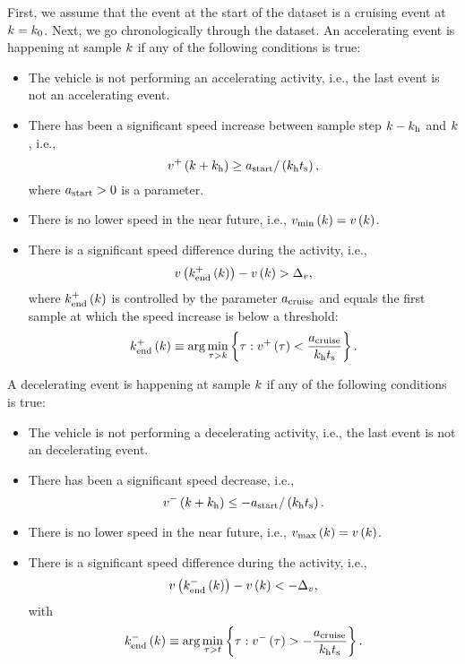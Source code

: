 First, we assume that the event at the start of the dataset is a cruising event at $k=k_{0}$. Next, we go chronologically through the dataset. An accelerating event is happening at sample $k$ if any of the following conditions is true:
\begin{itemize}
	\item The vehicle is not performing an accelerating activity, i.e., the last event is not an accelerating event.
	\item \cstarta There has been a significant speed increase between sample step $k-k_{\mathrm{h}}$ and $k$, i.e., 
	\begin{equation}
		v^{+}\left(k+k_{\mathrm{h}}\right) \geq a_\mathrm{start} / \left( k_{\mathrm{h}}t_\mathrm{s} \right),
	\end{equation} \cenda
	where $a_\mathrm{start}>0$ is a parameter.
	\item There is no lower speed in the near future, i.e., $v_{\mathrm{min}}\left(k\right)=v\left(k\right)$.
	\item There is a significant speed difference during the activity, i.e., 
	\begin{equation}
		v\left(k_{\mathrm{end}}^{+}\left(k\right)\right) - v\left(k\right) > \Delta_{v},
	\end{equation}
	where $k_{\mathrm{end}}^{+}\left(k\right)$ is controlled by the parameter $a_\mathrm{cruise}$ and \cstarta equals the first sample at which the speed increase is below a threshold\cenda:
	\begin{equation}
		k_{\mathrm{end}}^{+}\left(k\right) \equiv \arg \min_{\tau > k} \left\{ \tau: v^{+}\left(\tau\right) < \frac{a_\mathrm{cruise}}{k_{\mathrm{h}}t_\mathrm{s}} \right\}.
	\end{equation}
\end{itemize}

A decelerating event is happening at sample $k$ if any of the following conditions is true:
\begin{itemize}
	\item The vehicle is not performing a decelerating activity, i.e., the last event is not an decelerating event.
	\item \cstarta There has been a significant speed decrease, i.e., 
	\begin{equation}
		v^{-}\left(k+k_{\mathrm{h}}\right) \leq -a_\mathrm{start} / \left( k_{\mathrm{h}}t_\mathrm{s} \right).
	\end{equation} \cenda
	\item There is no lower speed in the near future, i.e., $v_{\mathrm{max}}\left(k\right)=v\left(k\right)$.
	\item There is a significant speed difference during the activity, i.e., 
	\begin{equation}
		v\left(k_{\mathrm{end}}^{-}\left(k\right)\right) - v\left(k\right) < -\Delta_{v},
	\end{equation}
	with
	\begin{equation}
		k_{\mathrm{end}}^{-}\left(k\right) \equiv \arg \min_{\tau > t} \left\{ \tau: v^{-}\left(\tau\right) > -\frac{a_\mathrm{cruise}}{k_{\mathrm{h}}t_\mathrm{s}} \right\}.
	\end{equation}
\end{itemize}

